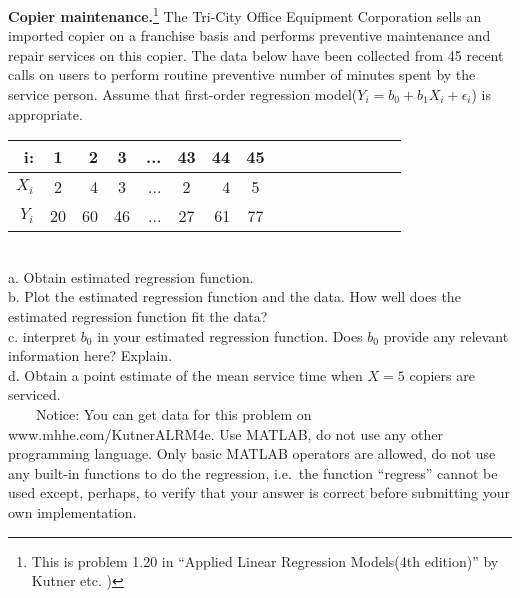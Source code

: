 \documentclass[12pt]{article}
\begin{document}
 { \textbf{Copier maintenance.}\footnote[1]{This is
problem 1.20 in ``Applied Linear Regression Models(4th edition)'' by
Kutner etc. )} The Tri-City Office Equipment Corporation sells an
imported copier on a franchise basis and performs preventive
maintenance and repair services on this copier. The data below have
been collected from 45 recent calls on users to perform routine
preventive number of minutes spent by the service person. Assume
that first-order regression model($Y_i=b_0+b_1 X_i+\epsilon_i$) is
appropriate.
\begin{table}[htdp]
\begin{center}
\begin{tabular}{rcrcrcrcrcrcrcrc}
\textbf{i:} &\textbf{1} &\textbf{2}& \textbf{3}&...&\textbf{43}&\textbf{44}&\textbf{45}\\
\hline \textbf{$X_i$} &2 &4 &3 &... &2 &4 &5\\
\textbf{$Y_i$} &20 &60 &46 &... &27 &61 &77
\end{tabular}
\end{center}
\end{table}\\

a. Obtain estimated regression function.\\
b. Plot the estimated regression function and the data. How well
does the estimated regression function fit the data?\\
c. interpret $b_0$ in your estimated regression function. Does $b_0$
provide any relevant information here? Explain.\\
d. Obtain a point estimate of the mean service time when $X=5$
copiers are serviced.\\
\indent~~~~Notice: You can get data for this problem on
www.mhhe.com/KutnerALRM4e. Use MATLAB, do not
use any other programming language. Only basic MATLAB operators are
allowed, do not use any built-in functions to do the regression, i.e.~the function ``regress'' cannot be used except, perhaps, to verify that your answer is correct before submitting your own implementation. \\}
 { \vfill
  \answer
} { }



\problemsdone
\end{document}
